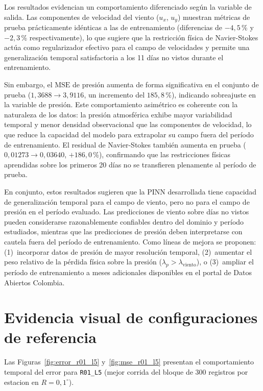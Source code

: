 Los resultados evidencian un comportamiento diferenciado según la variable de salida.
Las componentes de velocidad del viento ($u_x$, $u_y$) muestran métricas de prueba
prácticamente idénticas a las de entrenamiento (diferencias de $-4{,}5$\,\% y $-2{,}3$\,\%
respectivamente), lo que sugiere que la restricción física de Navier-Stokes actúa como
regularizador efectivo para el campo de velocidades y permite una generalización temporal
satisfactoria a los 11 días no vistos durante el entrenamiento.

Sin embargo, el $\text{MSE}$ de presión aumenta de forma significativa en el conjunto de
prueba ($1{,}3688 \to 3{,}9116$, un incremento del $185{,}8$\,\%), indicando sobreajuste en la
variable de presión. Este comportamiento asimétrico es coherente con la naturaleza de los datos:
la presión atmosférica exhibe mayor variabilidad temporal y menor densidad observacional que las
componentes de velocidad, lo que reduce la capacidad del modelo para extrapolar su campo fuera
del período de entrenamiento. El residual de Navier-Stokes también aumenta en prueba
($0{,}01273 \to 0{,}03640$, $+186{,}0$\,\%), confirmando que las restricciones físicas aprendidas
sobre los primeros 20 días no se transfieren plenamente al período de prueba.

En conjunto, estos resultados sugieren que la PINN desarrollada tiene capacidad de
generalización temporal para el campo de viento, pero no para el campo de presión en el período
evaluado. Las predicciones de viento sobre días no vistos pueden considerarse razonablemente
confiables dentro del dominio y período estudiados, mientras que las predicciones de presión
deben interpretarse con cautela fuera del período de entrenamiento. Como líneas de mejora se
proponen: (1)~incorporar datos de presión de mayor resolución temporal, (2)~aumentar el peso
relativo de la pérdida física sobre la presión ($\lambda_p > \lambda_{\text{viento}}$),
o (3)~ampliar el período de entrenamiento a meses adicionales disponibles en el portal de
Datos Abiertos Colombia.

\section{Evidencia visual de configuraciones de referencia}

Las Figuras~\ref{fig:error_r01_l5} y~\ref{fig:mse_r01_l5} presentan el comportamiento temporal del error para \texttt{R01\_L5} (mejor corrida del bloque de 300 registros por estacion en $R=0{,}1^\circ$).

